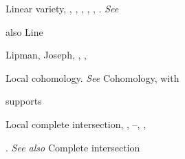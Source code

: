 {{\noindent\hspace*{0.0bp}Linear variety, , , , , , . \emph{See}\par
\noindent\hspace*{15.0bp}also Line\par
\noindent\hspace*{0.0bp}Lipman, Joseph, , , \par
\noindent\hspace*{0.0bp}Local cohomology. \emph{See} Cohomology, with\par
\noindent\hspace*{15.0bp}supports\par
\noindent\hspace*{0.0bp}Local complete intersection, , --, ,\par
\noindent\hspace*{15.0bp}. \emph{See also} Complete intersection\par
}
}
